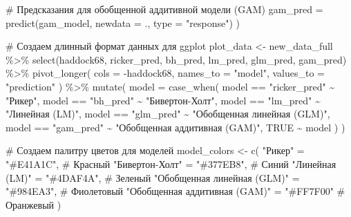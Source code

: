 \documentclass[
  letterpaper,
  DIV=11,
  numbers=noendperiod]{scrreprt}
\newenvironment{Shaded}{\begin{snugshade}}{\end{snugshade}}
\newcommand{\AttributeTok}[1]{\textcolor[rgb]{0.40,0.45,0.13}{#1}}
\newcommand{\CommentTok}[1]{\textcolor[rgb]{0.37,0.37,0.37}{#1}}
\newcommand{\ConstantTok}[1]{\textcolor[rgb]{0.56,0.35,0.01}{#1}}
\newcommand{\FunctionTok}[1]{\textcolor[rgb]{0.28,0.35,0.67}{#1}}
\newcommand{\NormalTok}[1]{\textcolor[rgb]{0.00,0.23,0.31}{#1}}
\newcommand{\OtherTok}[1]{\textcolor[rgb]{0.00,0.23,0.31}{#1}}
\newcommand{\SpecialCharTok}[1]{\textcolor[rgb]{0.37,0.37,0.37}{#1}}
\newcommand{\StringTok}[1]{\textcolor[rgb]{0.13,0.47,0.30}{#1}}
\begin{document}
\begin{Shaded}
\begin{Highlighting}[]
    \CommentTok{\# Предсказания для обобщенной аддитивной модели (GAM)}
    \AttributeTok{gam\_pred =} \FunctionTok{predict}\NormalTok{(gam\_model, }\AttributeTok{newdata =}\NormalTok{ ., }\AttributeTok{type =} \StringTok{"response"}\NormalTok{)}
\NormalTok{  )}

\CommentTok{\# Создаем длинный формат данных для ggplot}
\NormalTok{plot\_data }\OtherTok{\textless{}{-}}\NormalTok{ new\_data\_full }\SpecialCharTok{\%\textgreater{}\%}
  \FunctionTok{select}\NormalTok{(haddock68, ricker\_pred, bh\_pred, lm\_pred, glm\_pred, gam\_pred) }\SpecialCharTok{\%\textgreater{}\%}
  \FunctionTok{pivot\_longer}\NormalTok{(}
    \AttributeTok{cols =} \SpecialCharTok{{-}}\NormalTok{haddock68,}
    \AttributeTok{names\_to =} \StringTok{"model"}\NormalTok{,}
    \AttributeTok{values\_to =} \StringTok{"prediction"}
\NormalTok{  ) }\SpecialCharTok{\%\textgreater{}\%}
  \FunctionTok{mutate}\NormalTok{(}
    \AttributeTok{model =} \FunctionTok{case\_when}\NormalTok{(}
\NormalTok{      model }\SpecialCharTok{==} \StringTok{"ricker\_pred"} \SpecialCharTok{\textasciitilde{}} \StringTok{"Рикер"}\NormalTok{,}
\NormalTok{      model }\SpecialCharTok{==} \StringTok{"bh\_pred"} \SpecialCharTok{\textasciitilde{}} \StringTok{"Бивертон{-}Холт"}\NormalTok{,}
\NormalTok{      model }\SpecialCharTok{==} \StringTok{"lm\_pred"} \SpecialCharTok{\textasciitilde{}} \StringTok{"Линейная (LM)"}\NormalTok{,}
\NormalTok{      model }\SpecialCharTok{==} \StringTok{"glm\_pred"} \SpecialCharTok{\textasciitilde{}} \StringTok{"Обобщенная линейная (GLM)"}\NormalTok{,}
\NormalTok{      model }\SpecialCharTok{==} \StringTok{"gam\_pred"} \SpecialCharTok{\textasciitilde{}} \StringTok{"Обобщенная аддитивная (GAM)"}\NormalTok{,}
      \ConstantTok{TRUE} \SpecialCharTok{\textasciitilde{}}\NormalTok{ model}
\NormalTok{    )}
\NormalTok{  )}

\CommentTok{\# Создаем палитру цветов для моделей}
\NormalTok{model\_colors }\OtherTok{\textless{}{-}} \FunctionTok{c}\NormalTok{(}
  \StringTok{"Рикер"} \OtherTok{=} \StringTok{"\#E41A1C"}\NormalTok{,          }\CommentTok{\# Красный}
  \StringTok{"Бивертон{-}Холт"} \OtherTok{=} \StringTok{"\#377EB8"}\NormalTok{,  }\CommentTok{\# Синий}
  \StringTok{"Линейная (LM)"} \OtherTok{=} \StringTok{"\#4DAF4A"}\NormalTok{,  }\CommentTok{\# Зеленый}
  \StringTok{"Обобщенная линейная (GLM)"} \OtherTok{=} \StringTok{"\#984EA3"}\NormalTok{, }\CommentTok{\# Фиолетовый}
  \StringTok{"Обобщенная аддитивная (GAM)"} \OtherTok{=} \StringTok{"\#FF7F00"} \CommentTok{\# Оранжевый}
\NormalTok{)}


\end{Highlighting}
\end{Shaded}
\end{document}
